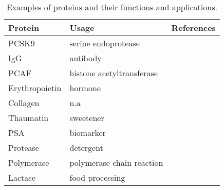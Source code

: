 \begin{refsection}
\begin{table}[htbp]
    \centering
    \begin{tabular}{ lll }
        \hline
        Protein & Usage & References \\
        \hline
        
        PCSK9 & serine endoprotease & \cite{Lambert2012,Horton2007} \\
        IgG & antibody & \cite{Sollid2005, Meize-Grochowski} \\
        PCAF & histone acetyltransferase & \cite{Mehta2011a} \\
        Erythropoietin & hormone & \cite{Haroon2003,Siren2001} \\
        Collagen & n.a & \cite{Bella1995} \\
        Thaumatin & sweetener & \cite{Green1999} \\
        PSA & biomarker & \cite{Crawford2014} \\
        Protease & detergent & \cite{Kirk2002} \\
        Polymerase & polymerase chain reaction & \cite{Berg2002} \\
        Lactase & food processing & \cite{Wiseman1993} \\

        \hline
    \end{tabular}
    \caption[Examples of proteins and their funtions and
    applications.]{Examples of proteins and their functions and applications.}
    \label{tab:protein-app}
\end{table}
 

\end{refsection}
